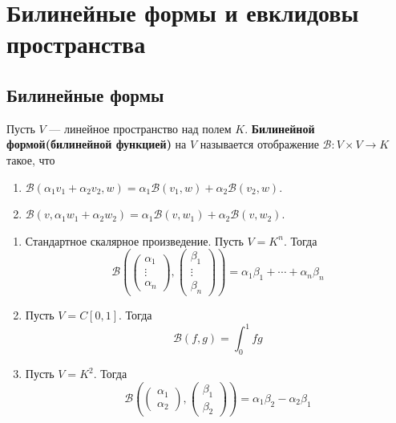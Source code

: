 \documentclass[../main.tex]{subfiles}
\begin{document}
\chapter{Билинейные формы и евклидовы пространства}
\section{Билинейные формы}

\begin{definition}
  Пусть $V$ --- линейное пространство над полем $K$. \textbf{Билинейной формой(билинейной функцией)} на $V$ называется отображение $\mathcal{B}\colon V \times V \to K$ такое, что
  \begin{enumerate}
    \item $\mathcal{B}(\alpha_1 v_1 + \alpha_2 v_2, w)
    = \alpha_1 \mathcal{B}(v_1, w) + \alpha_2 \mathcal{B}(v_2, w)$.
    \item $\mathcal{B}(v, \alpha_1 w_1 + \alpha_2 w_2)
    = \alpha_1 \mathcal{B}(v, w_1) + \alpha_2 \mathcal{B}(v, w_2)$.
  \end{enumerate}
\end{definition}

\begin{examples}
  \begin{enumerate}
    \item Стандартное скалярное произведение. Пусть $V = K^n$. Тогда
    \begin{equation*}
      \mathcal{B}\left(
        \begin{pmatrix}
          \alpha_1 \\
          \vdots \\
          \alpha_n
        \end{pmatrix},
        \begin{pmatrix}
          \beta_1 \\
          \vdots \\
          \beta_n
        \end{pmatrix}
      \right) =
      \alpha_1 \beta_1 + \dotsb + \alpha_n \beta_n
    \end{equation*}

    \item Пусть $V = C[0, 1]$. Тогда
    \begin{equation*}
      \mathcal{B}(f, g) = \int_{0}^{1} fg
    \end{equation*}

    \item Пусть $V = K^2$. Тогда
    \begin{equation*}
      \mathcal{B}\left(
        \begin{pmatrix}
          \alpha_1 \\
          \alpha_2
        \end{pmatrix},
        \begin{pmatrix}
          \beta_1 \\
          \beta_2
        \end{pmatrix}
      \right) =
      \alpha_1 \beta_2 - \alpha_2 \beta_1
    \end{equation*}
  \end{enumerate}
\end{examples}
\end{document}
